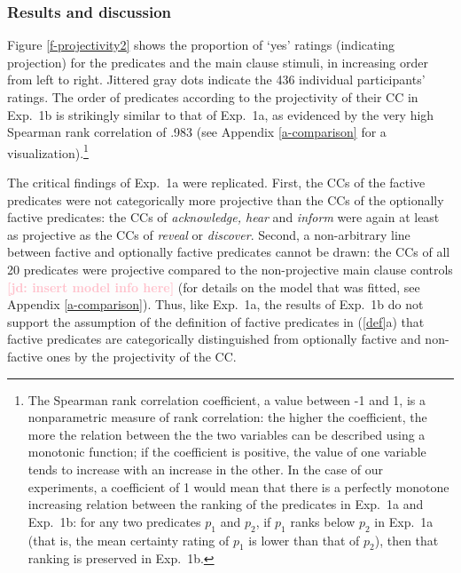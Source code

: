 \documentclass[11pt,fleqn]{article}
\newcommand{\jd}[1]{\textbf{\textcolor{Pink}{[jd: #1]}}}
\newcommand{\6}{\mbox{$[\hspace*{-.6mm}[$}}
\newcommand{\9}{\mbox{$]\hspace*{-.6mm}]$}}
\begin{document}
\subsubsection{Results and discussion}

Figure \ref{f-projectivity2} shows the proportion of `yes' ratings (indicating projection) for the predicates and the main clause stimuli, in increasing order from left to right. Jittered gray dots indicate the 436 individual participants' ratings. The order of predicates according to the projectivity of their CC in Exp.~1b is strikingly similar to that of Exp.~1a, as evidenced by the very high Spearman rank correlation of .983 (see Appendix \ref{a-comparison} for a visualization).\footnote{The Spearman rank correlation coefficient, a value between -1 and 1, is a nonparametric measure of rank correlation: the higher the coefficient, the more the relation between the the two variables can be described using a monotonic function; if the coefficient is positive, the value of one variable tends to increase with an increase in the other. In the case of our experiments, a coefficient of 1 would mean that there is a perfectly monotone increasing relation between the ranking of the predicates in Exp.~1a and Exp.~1b: for any two predicates $p_1$ and $p_2$, if $p_1$ ranks below $p_2$ in Exp.~1a (that is, the mean certainty rating of $p_1$ is lower than that of $p_2$), then that ranking is preserved in Exp.~1b.} 

The critical findings of Exp.~1a were replicated. First, the CCs of the factive predicates were not categorically more projective than the CCs of the optionally factive predicates:  the CCs of {\em acknowledge, hear} and {\em inform} were again at least as projective as the CCs of {\em reveal} or {\em discover}. Second, a non-arbitrary line between factive and optionally factive predicates cannot be drawn: the CCs of all 20 predicates were projective compared to the non-projective main clause controls \jd{insert model info here} (for details on the model that was fitted, see Appendix \ref{a-comparison}). Thus, like Exp.~1a, the results of Exp.~1b do not support the assumption of the definition of factive predicates in (\ref{def}a) that factive predicates are categorically distinguished from optionally factive and non-factive ones by the projectivity of the CC.
\end{document}
